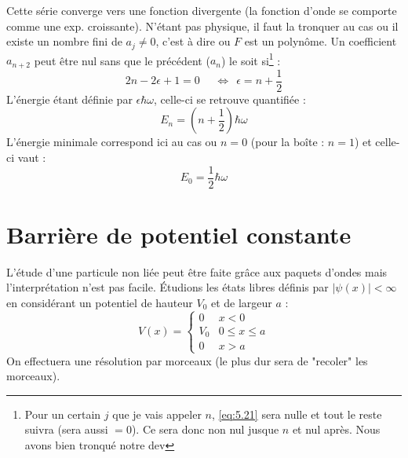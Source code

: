 \documentclass	[11pt, a4paper, openany]{book}
\begin{document}
Cette série converge vers une fonction divergente (la fonction d'onde se comporte comme une exp. croissante). N'étant pas physique, il faut la tronquer au cas ou il existe un nombre fini de $a_j \neq 0$, c'est à dire ou $F$ est un polynôme. Un coefficient $a_{n+2}$ peut être nul sans que le précédent ($a_n$) le soit si\footnote{Pour un certain $j$ que je vais appeler $n$, \eqref{eq:5.21} sera nulle et tout le reste suivra (sera aussi $=0$). Ce sera donc non nul jusque $n$ et nul après. Nous avons bien tronqué notre dev} :
\begin{equation}
2n-2\epsilon +1 = 0\  \ \ \ \ \ \Leftrightarrow\ \ \epsilon = n+\frac{1}{2}
\end{equation}
L'énergie étant définie par $\epsilon\hbar\omega$, celle-ci se retrouve quantifiée :
\begin{equation}
E_n = (n+\frac{1}{2})\hbar\omega
\end{equation}
L'énergie minimale correspond ici au cas ou $n=0$ (pour la boîte : $n=1$) et celle-ci vaut :
\begin{equation}
E_0 = \frac{1}{2}\hbar\omega
\end{equation}


\section{Barrière de potentiel constante}
L'étude d'une particule non liée peut être faite grâce aux paquets d'ondes mais l'interprétation n'est pas facile. Étudions les états libres définis par $|\psi(x)|<\infty$ en considérant un potentiel de hauteur $V_0$ et de largeur $a$ :
\begin{equation}
V(x) = \left\{\begin{array}{ll}
0 & x < 0\\
V_0 & 0\leq x \leq a\\
0 & x>a
\end{array}\right.
\end{equation}
On effectuera une résolution par morceaux (le plus dur sera de "recoler" les morceaux).\\
\end{document}
